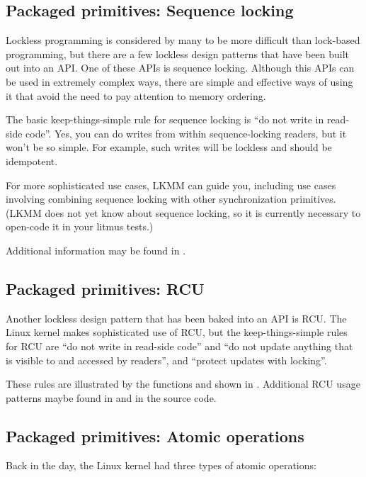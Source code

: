 \subsection{Packaged primitives: Sequence locking}

Lockless programming is considered by many to be more difficult than
lock-based programming, but there are a few lockless design patterns that
have been built out into an API\@.
One of these APIs is sequence locking.
Although this APIs can be used in extremely complex ways, there are simple
and effective ways of using it that avoid the need to pay attention to
memory ordering.

The basic keep-things-simple rule for sequence locking is ``do not write
in read-side code''.
Yes, you can do writes from within sequence-locking readers, but it
won't be so simple.
For example, such writes will be lockless and should be idempotent.

For more sophisticated use cases, LKMM can guide you, including use
cases involving combining sequence locking with other synchronization
primitives.
(LKMM does not yet know about sequence locking, so it is currently
necessary to open-code it in your litmus tests.)

Additional information may be found in .

\subsection{Packaged primitives: RCU}

Another lockless design pattern that has been baked into an API
is RCU\@.
The Linux kernel makes sophisticated use of RCU, but the
keep-things-simple rules for RCU are ``do not write in read-side code''
and ``do not update anything that is visible to and accessed by readers'',
and ``protect updates with locking''.

These rules are illustrated by the functions  and
 shown in .
Additional RCU usage patterns maybe found in 
and in the source code.


\subsection{Packaged primitives: Atomic operations}

Back in the day, the Linux kernel had three types of atomic operations:

